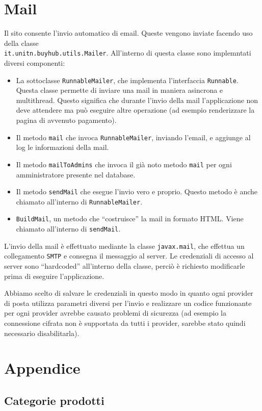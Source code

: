 \chapter{Mail}
Il sito consente l'invio automatico di email. Queste vengono inviate facendo uso della classe \\\texttt{it.unitn.buyhub.utils.Mailer}.
All'interno di questa classe sono implemntati diversi componenti:
\begin{itemize}
  \item La sottoclasse \texttt{RunnableMailer}, che implementa l'interfaccia \texttt{Runnable}. Questa classe permette di inviare una mail in maniera asincrona e multithread. Questo significa che durante l'invio della mail l'applicazione non deve attendere ma può eseguire altre operazione (ad esempio renderizzare la pagina di avvenuto pagamento).
  \item Il metodo \texttt{mail} che invoca \texttt{RunnableMailer}, inviando l'email, e aggiunge al log le informazioni della mail.
  \item Il metodo \texttt{mailToAdmins} che invoca il già noto metodo \texttt{mail} per ogni amministratore presente nel database.
  \item Il metodo \texttt{sendMail} che esegue l'invio vero e proprio. Questo metodo è anche chiamato all'interno di \texttt{RunnableMailer}.
  \item \texttt{BuildMail}, un metodo che ``costruisce'' la mail in formato HTML. Viene chiamato all'interno di \texttt{sendMail}.
\end{itemize}

L'invio della mail è effettuato mediante la classe \texttt{javax.mail}, che effettua un collegamento \texttt{SMTP} e consegna il messaggio al server. Le credenziali di accesso al server sono ``hardcoded'' all'interno della classe, perciò è richiesto modificarle prima di eseguire l'applicazione.

Abbiamo scelto di salvare le credenziali in questo modo in quanto ogni provider di posta utilizza parametri diversi per l'invio e realizzare un codice funzionante per ogni provider avrebbe causato problemi di sicurezza (ad esempio la connessione cifrata non è supportata da tutti i provider, sarebbe stato quindi necessario disabilitarla).

\chapter{Appendice}
\section{Categorie prodotti}


